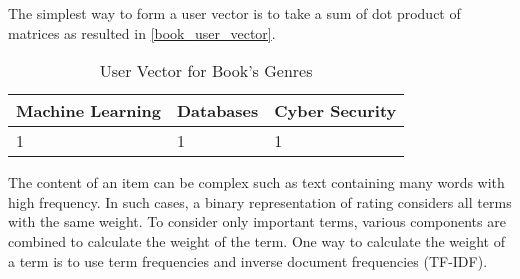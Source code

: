 \noindent The simplest way to form a user vector is to take a sum of dot product of matrices as resulted in \autoref{book_user_vector}.  
\begin{table}[]
\centering
\begin{tabular}{|l|l|l|}
\hline
Machine Learning & Databases & Cyber Security \\ \hline
1                & 1         & 1              \\ \hline
\end{tabular}
\caption{User Vector for Book's Genres}
\label{book_user_vector}
\end{table}

\noindent The content of an item can be complex such as text containing many words with high frequency. In such cases, a binary representation of rating considers all terms with the same weight. To consider only important terms, various components are combined to calculate the weight of the term. One way to calculate the weight of a term is to use term frequencies and inverse document frequencies (TF-IDF).


